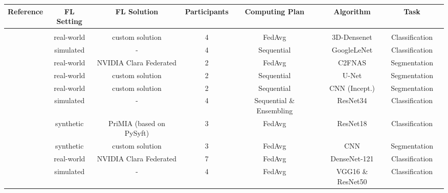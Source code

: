 \begin{table}
\begin{adjustbox}{width=1.0\textheight}
  \centering
  \begin{tabular}{cccccccc}
    Reference & FL Setting & FL Solution & Participants & Computing Plan & Algorithm & Task \\
    \hline \\[-2.5ex] %
    \cite{Xu2020ADiagnosis}                             & real-world & custom solution          & 4             & FedAvg                    & 3D-Densenet       & Classification \\
    \cite{Balachandar2020AccountingImaging}             & simulated  & -                        & 4             & Sequential                & GoogleLeNet       & Classification \\
    \cite{Wang2020AutomatedLearning}                    & real-world & NVIDIA Clara Federated   & 2             & FedAvg                    & C2FNAS            & Segmentation \\
    \cite{Remedios2020DistributedSegmentation}          & real-world & custom solution          & 2             & Sequential                & U-Net             & Segmentation  \\
    \cite{Remedios2019DistributedInjury}                & real-world & custom solution          & 2             & Sequential                & CNN (Incept.)     & Segmentation  \\
    \cite{Chang2018DistributedImaging}                  & simulated  & -                        & 4             & Sequential \& Ensembling  & ResNet34          & Classification \\
    \cite{Kaissis2021End-to-endImaging}                 & synthetic  & PriMIA (based on PySyft) & 3             & FedAvg                    & ResNet18          & Classification  \\
    \cite{Dou2021FederatedStudy}                        & synthetic  & custom solution          & 3             & FedAvg                    & CNN               & Segmentation \\
    \cite{Roth2020FederatedImplementation}              & real-world & NVIDIA Clara Federated   & 7             & FedAvg                    & DenseNet-121      & Classification \\
    \cite{Feki2021FederatedImages}                      & simulated  & -                        & 4             & FedAvg                    & VGG16 \& ResNet50 & Classification \\    

\end{tabular}
\end{adjustbox}
\end{table}
